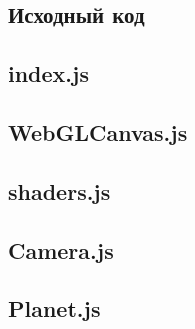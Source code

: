 \documentclass{bmstu}
\renewcommand{\includelistingpretty}[3]
{
	
}
\begin{document}
	
	\begin{appendices}
		\chapter{Исходный код}
		\section{index.js}
		\includelistingpretty{index.js}{JavaScript}{index.js}
		\section{WebGLCanvas.js}
		\includelistingpretty{WebGLCanvas.js}{JavaScript}{WebGLCanvas.js}
		\section{shaders.js}
		\includelistingpretty{shaders.js}{JavaScript}{shaders.js}
		\section{Camera.js}
		\includelistingpretty{Camera.js}{JavaScript}{Camera.js}
		\section{Planet.js}
		\includelistingpretty{Planet.js}{JavaScript}{Planet.js}
	\end{appendices}
	
\end{document}
